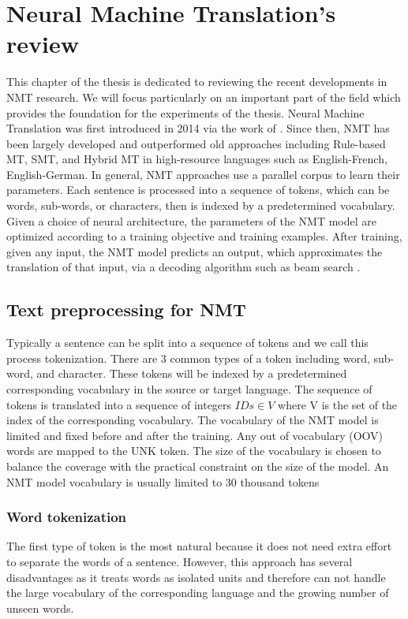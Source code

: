 \chapter{Neural Machine Translation's review \label{chap:2}} 
This chapter of the thesis is dedicated to reviewing the recent developments in NMT research. We will focus particularly on an important part of the field which provides the foundation for the experiments of the thesis. Neural Machine Translation was first introduced in 2014 via the work of \cite{bahdanau14neural,cho14properties}. Since then, NMT has been largely developed and outperformed old approaches including Rule-based MT, SMT, and Hybrid MT in high-resource languages such as English-French, English-German. In general, NMT approaches use a parallel corpus to learn their parameters. Each sentence is processed into a sequence of tokens, which can be words, sub-words, or characters, then is indexed by a predetermined vocabulary. Given a choice of neural architecture, the parameters of the NMT model are optimized according to a training objective and training examples. After training, given any input, the NMT model predicts an output, which approximates the translation of that input, via a decoding algorithm such as beam search \citep{koehn04pharaoh}.
\section{Text preprocessing for NMT \label{sec:2.1}}
Typically a sentence can be split into a sequence of tokens and we call this process tokenization. There are 3 common types of a token including word, sub-word, and character. These tokens will be indexed by a predetermined corresponding vocabulary in the source or target language. The sequence of tokens is translated into a sequence of integers $IDs \in V$ where V is the set of the index of the corresponding vocabulary. The vocabulary of the NMT model is limited and fixed before and after the training. Any out of vocabulary (OOV) words are mapped to the UNK token. The size of the vocabulary is chosen to balance the coverage with the practical constraint on the size of the model. An NMT model vocabulary is usually limited to 30 thousand tokens 
\subsection{Word tokenization}
The first type of token is the most natural because it does not need extra effort to separate the words of a sentence. However, this approach has several disadvantages as it treats words as isolated units and therefore can not handle the large vocabulary of the corresponding language and the growing number of unseen words.
